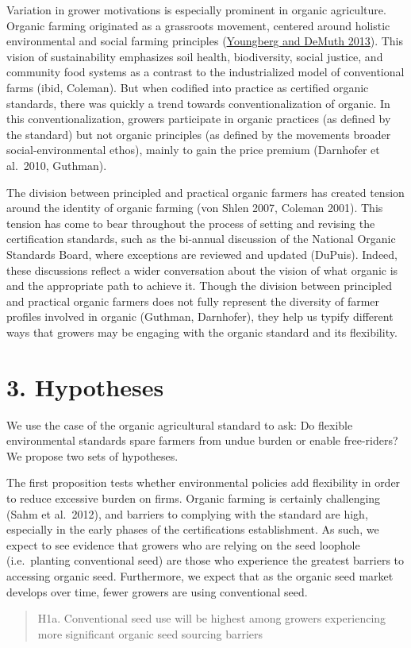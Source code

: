 \documentclass[twoside,12pt,final]{ucthesis-CA2012}
\begin{document}
\begin{ucmainmatter}
Variation in grower motivations is especially prominent in organic
agriculture. Organic farming originated as a grassroots movement,
centered around holistic environmental and social farming principles
(\protect\hyperlink{ref-Youngberg_DeMuth_2013}{Youngberg and DeMuth 2013}).
This vision of sustainability emphasizes soil health, biodiversity,
social justice, and community food systems as a contrast to the
industrialized model of conventional farms (ibid, Coleman). But when
codified into practice as certified organic standards, there was quickly
a trend towards \textquotesingle conventionalization\textquotesingle{} of organic. In this
conventionalization, growers participate in organic practices (as
defined by the standard) but not organic principles (as defined by the
movement\textquotesingle s broader social-environmental ethos), mainly to gain the
price premium (Darnhofer et al.~2010, Guthman).

The division between \textquotesingle principled\textquotesingle{} and \textquotesingle practical\textquotesingle{} organic farmers
has created tension around the identity of organic farming (von Shlen
2007, Coleman 2001). This tension has come to bear throughout the
process of setting and revising the certification standards, such as the
bi-annual discussion of the National Organic Standards Board, where
exceptions are reviewed and updated (DuPuis). Indeed, these discussions
reflect a wider conversation about the vision of what organic is and the
appropriate path to achieve it. Though the division between
\textquotesingle principled\textquotesingle{} and \textquotesingle practical\textquotesingle{} organic farmers does not fully
represent the diversity of farmer profiles involved in organic (Guthman,
Darnhofer), they help us typify different ways that growers may be
engaging with the organic standard and its flexibility.

\hypertarget{hypotheses}{%
\section{3. Hypotheses}\label{hypotheses}}

We use the case of the organic agricultural standard to ask: Do flexible
environmental standards spare farmers from undue burden or enable
free-riders? We propose two sets of hypotheses.

The first proposition tests whether environmental policies add
flexibility in order to reduce excessive burden on firms. Organic
farming is certainly challenging (Sahm et al.~2012), and barriers to
complying with the standard are high, especially in the early phases of
the certification\textquotesingle s establishment. As such, we expect to see evidence
that growers who are relying on the seed loophole (i.e.~planting
conventional seed) are those who experience the greatest barriers to
accessing organic seed. Furthermore, we expect that as the organic seed
market develops over time, fewer growers are using conventional seed.
\begin{quote}
H1a. Conventional seed use will be highest among growers experiencing
more significant organic seed sourcing barriers


\end{quote}
\end{ucmainmatter}
\end{document}

